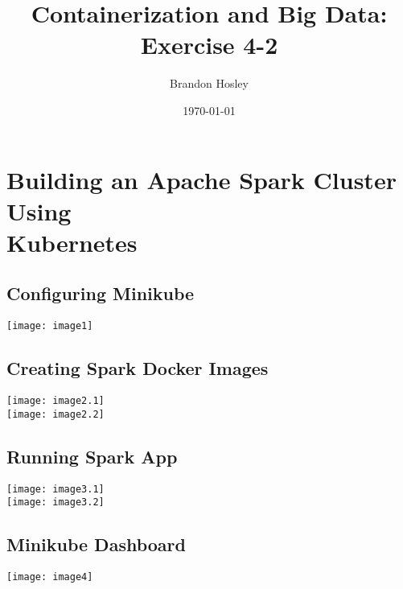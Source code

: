 \documentclass[]{article}
\title{Containerization and Big Data: Exercise 4-2}
\author{Brandon Hosley}
\date{\today}
\begin{document}
\maketitle
	
\setcounter{section}{3}
\section{Building an Apache Spark Cluster Using \\ Kubernetes}
\setcounter{subsection}{3}
	
\subsection{Configuring Minikube}
	\texttt{[image: image1]}
	
\subsection{Creating Spark Docker Images}
	\texttt{[image: image2.1]} \vspace{1em} \\
	\texttt{[image: image2.2]}
	
\subsection{Running Spark App}
	\texttt{[image: image3.1]} \\
	\texttt{[image: image3.2]}
	
\subsection{Minikube Dashboard}
	\texttt{[image: image4]}
	
\end{document}
